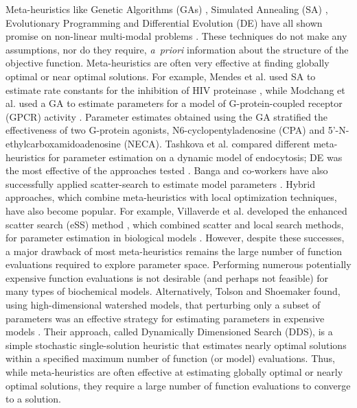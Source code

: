 \documentclass{bmcart}
\begin{document}

Meta-heuristics like Genetic Algorithms (GAs) \cite{goldberg2006genetic}, Simulated Annealing (SA) \cite{kirkpatrick1983optimization},
Evolutionary Programming \cite{fogel2009artificial} and Differential Evolution (DE) \cite{storn1997differential,tsai2005evolutionary,wang2001hybrid,noman2007inferring} have all shown promise on non-linear multi-modal problems \cite{sun2012parameter}.
These techniques do not make any assumptions, nor do they require, \textit{a~priori} information about the structure of the objective function.
Meta-heuristics are often very effective at finding globally optimal or near optimal solutions.
For example, Mendes et al. used SA to estimate rate constants for the inhibition of HIV proteinase \cite{mendes1998non},
while Modchang et al. used a GA to estimate parameters for a model of G-protein-coupled receptor (GPCR) activity \cite{modchang2008mathematical}.
Parameter estimates obtained using the GA stratified the effectiveness of two G-protein agonists, N6-cyclopentyladenosine (CPA) and 5'-N-ethylcarboxamidoadenosine (NECA).
Tashkova et al. compared different meta-heuristics for parameter estimation on a dynamic model of endocytosis;
DE was the most effective of the approaches tested \cite{tashkova2011parameter}.
Banga and co-workers have also successfully applied scatter-search to estimate model parameters \cite{villaverde2012cooperative,rodriguez2006novel,egea2007scatter}.
Hybrid approaches, which combine meta-heuristics with local optimization techniques, have also become popular.
For example, Villaverde et al. developed the enhanced scatter search (eSS) method \cite{villaverde2015biopredyn}, which combined scatter and local search methods,
for parameter estimation in biological models  \cite{egea2007scatter}.
However, despite these successes, a major drawback of most meta-heuristics remains the large number of function evaluations required to explore parameter space.
Performing numerous potentially expensive function evaluations is not desirable (and perhaps not feasible) for many types of biochemical models.
Alternatively, Tolson and Shoemaker found, using high-dimensional watershed models, that perturbing only a subset of parameters was an effective strategy for estimating
parameters in expensive models \cite{tolson2007dynamically}. Their approach, called Dynamically Dimensioned Search (DDS),
is a simple stochastic single-solution heuristic that estimates nearly optimal solutions within a specified maximum number of function (or model) evaluations.
Thus, while meta-heuristics are often effective at estimating globally optimal or nearly optimal solutions, they require a large number of function evaluations to
converge to a solution.
\end{document}
